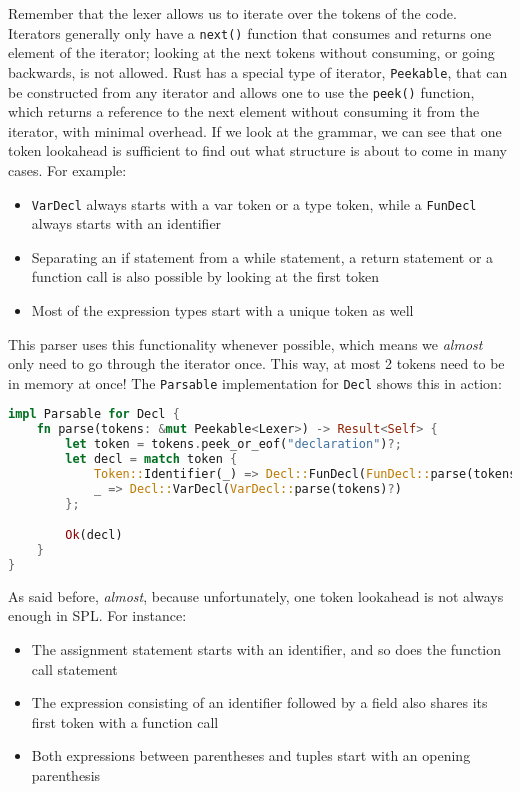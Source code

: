 Remember that the lexer allows us to iterate over the tokens of the code. Iterators generally only have a \lstinline[language=rust]|next()| function that consumes and returns one element of the iterator; looking at the next tokens without consuming, or going backwards, is not allowed. Rust has a special type of iterator, \lstinline[language=rust]|Peekable|, that can be constructed from any iterator and allows one to use the \lstinline[language=rust]|peek()| function, which returns a reference to the next element without consuming it from the iterator, with minimal overhead. If we look at the grammar, we can see that one token lookahead is sufficient to find out what structure is about to come in many cases. For example:

\begin{itemize}
    \item \lstinline[language=rust]|VarDecl| always starts with a var token or a type token, while a \lstinline[language=rust]|FunDecl| always starts with an identifier
    \item Separating an if statement from a while statement, a return statement or a function call is also possible by looking at the first token
    \item Most of the expression types start with a unique token as well
\end{itemize}

This parser uses this functionality whenever possible, which means we \textit{almost} only need to go through the iterator once. This way, at most 2 tokens need to be in memory at once! The \lstinline[language=rust]|Parsable| implementation for \lstinline[language=rust]|Decl| shows this in action:

\begin{lstlisting}[language=rust]
impl Parsable for Decl {
    fn parse(tokens: &mut Peekable<Lexer>) -> Result<Self> {
        let token = tokens.peek_or_eof("declaration")?;
        let decl = match token {
            Token::Identifier(_) => Decl::FunDecl(FunDecl::parse(tokens)?),
            _ => Decl::VarDecl(VarDecl::parse(tokens)?)
        };

        Ok(decl)
    }
}
\end{lstlisting}

As said before, \textit{almost}, because unfortunately, one token lookahead is not always enough in SPL. For instance:

\begin{itemize}
    \item The assignment statement starts with an identifier, and so does the function call statement
    \item The expression consisting of an identifier followed by a field also shares its first token with a function call
    \item Both expressions between parentheses and tuples start with an opening parenthesis
\end{itemize}

